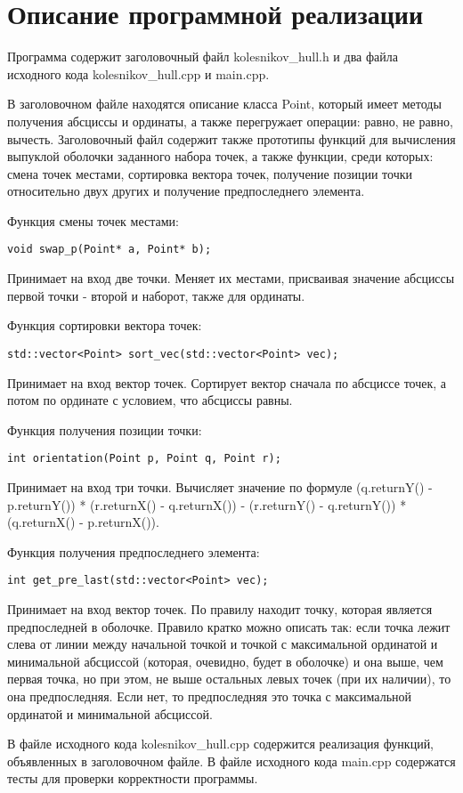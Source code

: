 \documentclass{report}
\begin{document}
\section*{Описание программной реализации}
Программа содержит заголовочный файл kolesnikov\_hull.h и два файла исходного кода kolesnikov\_hull.cpp и main.cpp.
\par В заголовочном файле находятся описание класса Point, который имеет методы получения абсциссы и ординаты, а также перегружает операции: равно, не равно, вычесть. Заголовочный файл содержит также прототипы функций для вычисления выпуклой оболочки заданного набора точек, а также функции, среди которых: смена точек местами, сортировка вектора точек, получение позиции точки относительно двух других и получение предпоследнего элемента.
\par Функция смены точек местами:
\begin{lstlisting}
void swap_p(Point* a, Point* b);
\end{lstlisting}
Принимает на вход две точки. Меняет их местами, присваивая значение абсциссы первой точки - второй и наборот, также для ординаты.
\par Функция сортировки вектора точек:
\begin{lstlisting}
std::vector<Point> sort_vec(std::vector<Point> vec);
\end{lstlisting}
Принимает на вход вектор точек. Сортирует вектор сначала по абсциссе точек, а потом по ординате с условием, что абсциссы равны.
\par Функция получения позиции точки:
\begin{lstlisting}
int orientation(Point p, Point q, Point r);
\end{lstlisting}
Принимает на вход три точки. Вычисляет значение по формуле (q.returnY() - p.returnY()) *
 (r.returnX() - q.returnX()) - (r.returnY() - q.returnY()) * (q.returnX() - p.returnX()).
\par Функция получения предпоследнего элемента:
\begin{lstlisting}
int get_pre_last(std::vector<Point> vec);
\end{lstlisting}
Принимает на вход вектор точек. По правилу находит точку, которая является предпоследней в оболочке. Правило кратко можно описать так: если точка лежит слева от линии между начальной точкой и точкой с максимальной ординатой и минимальной абсциссой (которая, очевидно, будет в оболочке) и она выше, чем первая точка, но при этом, не выше остальных левых точек (при их наличии), то она предпоследняя. Если нет, то предпоследняя это точка с максимальной ординатой и минимальной абсциссой.
\par В файле исходного кода kolesnikov\_hull.cpp содержится реализация функций, объявленных в заголовочном файле. В файле исходного кода main.cpp содержатся тесты для проверки корректности программы.
\newpage
\end{document}
